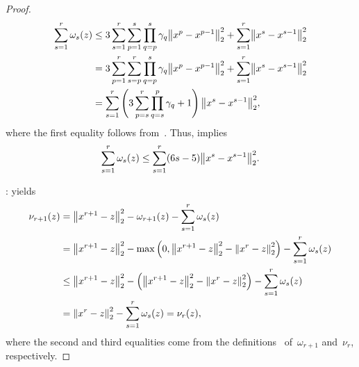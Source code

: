 \documentclass[../main]{subfiles}
\begin{document}
\begin{proof}
\begin{equation}
\begin{split}
        \sum_{s = 1}^r \omega_s(z)
        &\le 3 \sum_{s = 1}^r \sum_{p = 1}^s \prod_{q = p}^s \gamma_q \norm*{x^p - x^{p - 1}}_2^2 + \sum_{s = 1}^r \norm*{x^s - x^{s - 1}}_2^2 \\
        &= 3 \sum_{p = 1}^r \sum_{s = p}^r \prod_{q = p}^s \gamma_q \norm*{x^p - x^{p - 1}}_2^2 + \sum_{s = 1}^r \norm*{x^s - x^{s - 1}}_2^2 \\
        &= \sum_{s = 1}^r \left( 3 \sum_{p = s}^r \prod_{q = s}^p \gamma_q + 1 \right) \norm*{x^s - x^{s - 1}}_2^2
        ,\end{split}
    \end{equation}
    where the first equality follows from~.
    Thus,  implies
    \begin{equation}
        \sum_{s = 1}^{r} \omega_s(z) \le \sum_{s = 1}^{r} (6 s - 5) \norm*{x^s - x^{s - 1}}_2^2 
    .\end{equation}

    :
     yields
    \begin{equation}
        \begin{split}
            \nu_{r + 1}(z) &= \norm*{x^{r + 1} - z}_2^2 - \omega_{r + 1}(z) - \sum_{s = 1}^r \omega_s(z) \\
                           &= \norm*{x^{r + 1} - z}_2^2 - \max \left( 0, \norm*{x^{r + 1} - z}_2^2 - \norm*{x^r - z}_2^2 \right) - \sum_{s = 1}^{r} \omega_s(z) \\
                           &\le \norm*{x^{r + 1} - z}_2^2 - \left( \norm*{x^{r + 1} - z}_2^2 - \norm*{x^r - z}_2^2 \right) - \sum_{s = 1}^{r} \omega_s(z) \\
                           &= \norm*{x^r - z}_2^2 - \sum_{s = 1}^{r} \omega_s(z) = \nu_r(z) 
        ,\end{split}
    \end{equation} 
    where the second and third equalities come from the definitions~ of~$\omega_{r + 1}$ and~$\nu_r$, respectively.
\end{proof}
\end{document}
